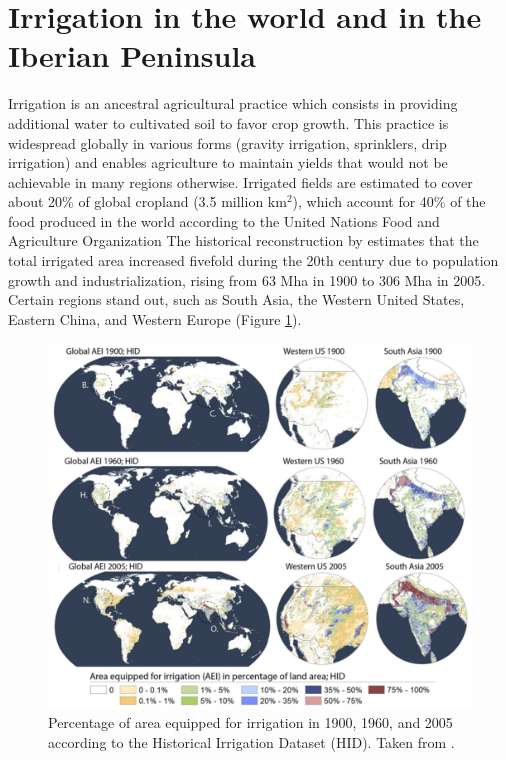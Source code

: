 \section{Irrigation in the world and in the Iberian Peninsula}
Irrigation is an ancestral agricultural practice which consists in providing additional water to cultivated soil to favor crop growth.
This practice is widespread globally in various forms (gravity irrigation, sprinklers, drip irrigation) and enables agriculture to maintain yields that would not be achievable in many regions otherwise.
Irrigated fields are estimated to cover about 20\% of global cropland (3.5 million km$^2$), which account for 40\% of the food produced in the world according to the United Nations Food and Agriculture Organization \citep{UNESCO2019,mcdermid_irrigation_2023}
The historical reconstruction by \citet{siebert_global_2015} estimates that the total irrigated area increased fivefold during the 20th century due to population growth and industrialization, rising from 63 Mha in 1900 to 306 Mha in 2005. Certain regions stand out, such as South Asia, the Western United States, Eastern China, and Western Europe (Figure \ref{irrig_evolution_map}).

\begin{figure}[ht]
    \centering
    \includegraphics[width=\textwidth]{images/intro/irrig_evolution_Siebert.png}
    \caption{Percentage of area equipped for irrigation in 1900, 1960, and 2005 according to the Historical Irrigation Dataset (HID). Taken from \citet{siebert_global_2015}.}
    \label{irrig_evolution_map}
\end{figure}

